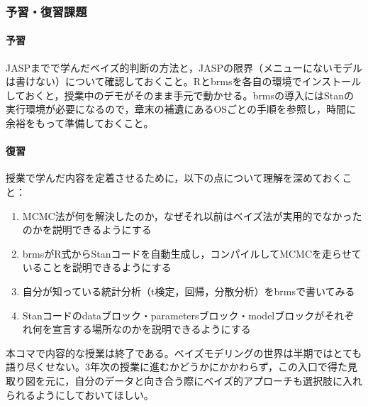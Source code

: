 \subsubsection{予習・復習課題}
\paragraph{予習}
JASPまでで学んだベイズ的判断の方法と，JASPの限界（メニューにないモデルは書けない）について確認しておくこと。Rとbrmsを各自の環境でインストールしておくと，授業中のデモがそのまま手元で動かせる。brmsの導入にはStanの実行環境が必要になるので，章末の補遺にあるOSごとの手順を参照し，時間に余裕をもって準備しておくこと。

\paragraph{復習}
授業で学んだ内容を定着させるために，以下の点について理解を深めておくこと：
\begin{enumerate}
  \item MCMC法が何を解決したのか，なぜそれ以前はベイズ法が実用的でなかったのかを説明できるようにする
  \item brmsがR式からStanコードを自動生成し，コンパイルしてMCMCを走らせていることを説明できるようにする
  \item 自分が知っている統計分析（t検定，回帰，分散分析）をbrmsで書いてみる
  \item Stanコードのdataブロック・parametersブロック・modelブロックがそれぞれ何を宣言する場所なのかを説明できるようにする
\end{enumerate}
本コマで内容的な授業は終了である。ベイズモデリングの世界は半期ではとても語り尽くせない。3年次の授業に進むかどうかにかかわらず，この入口で得た見取り図を元に，自分のデータと向き合う際にベイズ的アプローチも選択肢に入れられるようにしておいてほしい。
